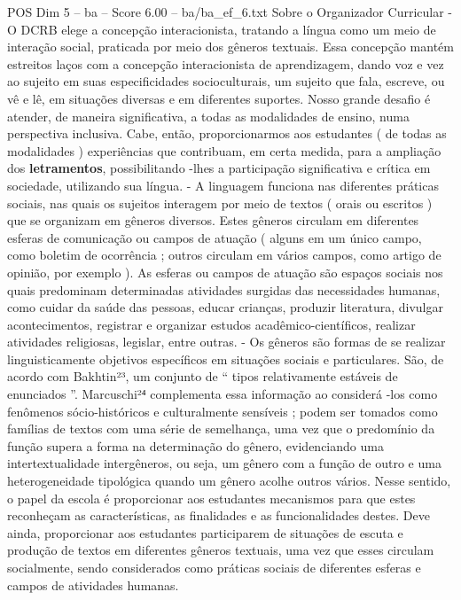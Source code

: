 \begin{textsample}{POS Dim 5 – ba – Score 6.00 – ba/ba\_ef\_6.txt}  \label{ex:f5_pos_272}
Sobre o Organizador Curricular - O DCRB elege a concepção interacionista, tratando a língua como um meio de interação social, praticada por meio dos gêneros textuais.
Essa concepção mantém estreitos laços com a concepção interacionista de aprendizagem, dando voz e vez ao sujeito em suas especificidades socioculturais, um sujeito que fala, escreve, ou vê e lê, em situações diversas e em diferentes suportes.
Nosso grande desafio é atender, de maneira significativa, a todas as modalidades de ensino, numa perspectiva inclusiva.
Cabe, então, proporcionarmos aos estudantes ( de todas as modalidades ) experiências que contribuam, em certa medida, para a ampliação dos \textbf{letramentos}, possibilitando -lhes a participação significativa e crítica em sociedade, utilizando sua língua. - A linguagem funciona nas diferentes práticas sociais, nas quais os sujeitos interagem por meio de textos ( orais ou escritos ) que se organizam em gêneros diversos.
Estes gêneros circulam em diferentes esferas de comunicação ou campos de atuação ( alguns em um único campo, como boletim de ocorrência ; outros circulam em vários campos, como artigo de opinião, por exemplo ).
As esferas ou campos de atuação são espaços sociais nos quais predominam determinadas atividades surgidas das necessidades humanas, como cuidar da saúde das pessoas, educar crianças, produzir literatura, divulgar acontecimentos, registrar e organizar estudos acadêmico-científicos, realizar atividades religiosas, legislar, entre outras. - Os gêneros são formas de se realizar linguisticamente objetivos específicos em situações sociais e particulares.
São, de acordo com Bakhtin²³, um conjunto de “ tipos relativamente estáveis de enunciados ”.
Marcuschi²⁴ complementa essa informação ao considerá -los como fenômenos sócio-históricos e culturalmente sensíveis ; podem ser tomados como famílias de textos com uma série de semelhança, uma vez que o predomínio da função supera a forma na determinação do gênero, evidenciando uma intertextualidade intergêneros, ou seja, um gênero com a função de outro e uma heterogeneidade tipológica quando um gênero acolhe outros vários.
Nesse sentido, o papel da escola é proporcionar aos estudantes mecanismos para que estes reconheçam as características, as finalidades e as funcionalidades destes.
Deve ainda, proporcionar aos estudantes participarem de situações de escuta e produção de textos em diferentes gêneros textuais, uma vez que esses circulam socialmente, sendo considerados como práticas sociais de diferentes esferas e campos de atividades humanas.

\end{textsample}
